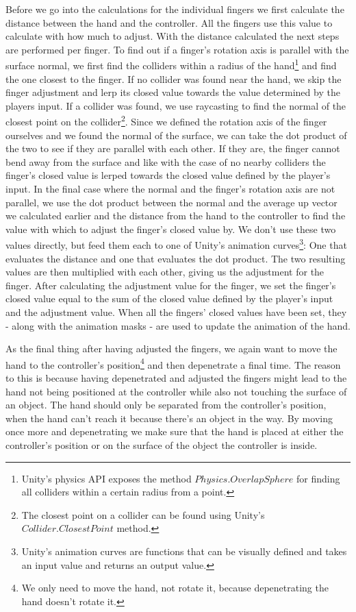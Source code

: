 Before we go into the calculations for the individual fingers we first calculate the distance between the hand and the controller. All the fingers use this value to calculate with how much to adjust. With the distance calculated the next steps are performed per finger. To find out if a finger's rotation axis is parallel with the surface normal, we first find the colliders within a radius of the hand\footnote{Unity's physics API exposes the method $Physics.OverlapSphere$ for finding all colliders within a certain radius from a point.} and find the one closest to the finger. If no collider was found near the hand, we skip the finger adjustment and lerp its closed value towards the value determined by the players input. If a collider was found, we use raycasting to find the normal of the closest point on the collider\footnote{The closest point on a collider can be found using Unity's $Collider.ClosestPoint$ method.}. Since we defined the rotation axis of the finger ourselves and we found the normal of the surface, we can take the dot product of the two to see if they are parallel with each other. If they are, the finger cannot bend away from the surface and like with the case of no nearby colliders the finger's closed value is lerped towards the closed value defined by the player's input. In the final case where the normal and the finger's rotation axis are not parallel, we use the dot product between the normal and the average up vector we calculated earlier and the distance from the hand to the controller to find the value with which to adjust the finger's closed value by. We don't use these two values directly, but feed them each to one of Unity's animation curves\footnote{Unity's animation curves are functions that can be visually defined and takes an input value and returns an output value.}: One that evaluates the distance and one that evaluates the dot product. The two resulting values are then multiplied with each other, giving us the adjustment for the finger. After calculating the adjustment value for the finger, we set the finger's closed value equal to the sum of the closed value defined by the player's input and the adjustment value. When all the fingers' closed values have been set, they - along with the animation masks - are used to update the animation of the hand.

As the final thing after having adjusted the fingers, we again want to move the hand to the controller's position\footnote{We only need to move the hand, not rotate it, because depenetrating the hand doesn't rotate it.} and then depenetrate a final time. The reason to this is because having depenetrated and adjusted the fingers might lead to the hand not being positioned at the controller while also not touching the surface of an object. The hand should only be separated from the controller's position, when the hand can't reach it because there's an object in the way. By moving once more and depenetrating we make sure that the hand is placed at either the controller's position or on the surface of the object the controller is inside.

